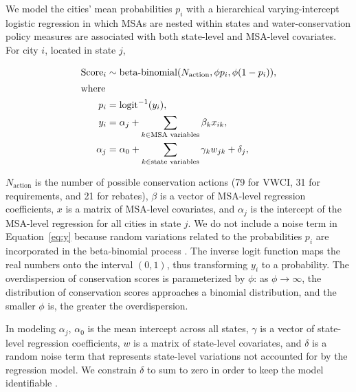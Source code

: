 \documentclass[draft,linenumbers]{agujournal}
\begin{document}
We model the cities' mean probabilities $p_i$
with a hierarchical varying-intercept logistic
regression in which MSAs are nested within states and
water-conservation policy measures
are associated with both
state-level and MSA-level covariates.
For city $i$, located in state $j$,
\begin{linenomath*}
\begin{align}
\text{Score}_i \sim{}& \text{beta-binomial}(N_{\text{action}}, \phi p_i, \phi (1 - p_i)), \\
\intertext{where}
p_i ={}& \text{logit}^{-1}(y_i),\\
y_i ={}& \alpha_{j} + \sum_{k \in \text{MSA variables}} \beta_k x_{ik}, \label{eq:y}\\
\alpha_{j} ={}&
\alpha_0  + \sum_{k \in \text{state variables}} \gamma_k w_{jk} + \delta_{j},
\end{align}
\end{linenomath*}
$N_{\text{action}}$ is the number of possible conservation actions
(79 for VWCI, 31 for requirements, and
21 for rebates),
$\beta$ is a vector of MSA-level regression coefficients,
$x$ is a matrix of MSA-level covariates,
and $\alpha_j$ is the intercept of the MSA-level regression
for all cities in state $j$.
We do not include a noise term in Equation~\ref{eq:y} because random variations
related to the probabilities $p_i$ are incorporated in the beta-binomial
process \citep[p.~321]{gelman:arm:2007}.
The inverse logit function maps the real numbers onto the interval $(0,1)$,
thus transforming $y_i$ to a probability.
The overdispersion of conservation scores is parameterized by $\phi$:
as $\phi \rightarrow \infty$, the distribution of conservation scores approaches
a binomial distribution, and the smaller $\phi$ is, the greater the
overdispersion.

In modeling $\alpha_j$,
$\alpha_0$ is the mean intercept across all states,
$\gamma$ is a vector of state-level regression coefficients,
$w$ is a matrix of state-level covariates,
and
$\delta$ is a random noise term that represents state-level variations not
accounted for by the regression model.
We constrain $\delta$ to sum to zero in order to keep the model identifiable
\citep[Ch.~23]{stan:manual:2015}.
\end{document}
